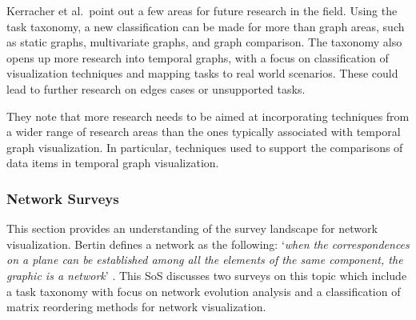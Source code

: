 

Kerracher et al.\ point out a few areas for future research in the field. Using the task taxonomy, a new classification can be made for more than graph areas, such as static graphs, multivariate graphs, and graph comparison. The taxonomy also opens up more research into temporal graphs, with a focus on classification of visualization techniques and mapping tasks to real world scenarios.  These could lead to further research on edges cases or unsupported tasks.

They note that more research needs to be aimed at incorporating techniques from a wider range of research areas than the ones typically associated with temporal graph visualization. In particular, techniques used to support the comparisons of data items in temporal graph visualization. 

\subsubsection{Network Surveys}
This section provides an understanding of the survey landscape for network visualization. Bertin defines a network as the following: `\textit{when the correspondences on a plane can be established among all the elements of the same component, the graphic is a network}' \cite{bertin1983semiology}. This SoS discusses two surveys on this topic which include a task taxonomy with focus on network evolution analysis and a classification of matrix reordering methods for network visualization.

